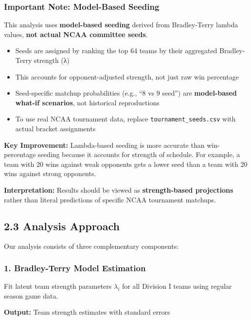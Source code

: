 \documentclass[
]{article}
\providecommand{\tightlist}{%
  \setlength{\itemsep}{0pt}\setlength{\parskip}{0pt}}
\begin{document}
\subsubsection{Important Note: Model-Based
Seeding}\label{important-note-model-based-seeding}

This analysis uses \textbf{model-based seeding} derived from
Bradley-Terry lambda values, \textbf{not actual NCAA committee seeds}.

\begin{itemize}
\tightlist
\item
  Seeds are assigned by ranking the top 64 teams by their aggregated
  Bradley-Terry strength (λ)
\item
  This accounts for opponent-adjusted strength, not just raw win
  percentage
\item
  Seed-specific matchup probabilities (e.g., ``8 vs 9 seed'') are
  \textbf{model-based what-if scenarios}, not historical reproductions
\item
  To use real NCAA tournament data, replace
  \texttt{tournament\_seeds.csv} with actual bracket assignments
\end{itemize}

\textbf{Key Improvement:} Lambda-based seeding is more accurate than
win-percentage seeding because it accounts for strength of schedule. For
example, a team with 20 wins against weak opponents gets a lower seed
than a team with 20 wins against strong opponents.

\textbf{Interpretation:} Results should be viewed as
\textbf{strength-based projections} rather than literal predictions of
specific NCAA tournament matchups.

\subsection{2.3 Analysis Approach}\label{analysis-approach}

Our analysis consists of three complementary components:

\subsubsection{1. Bradley-Terry Model
Estimation}\label{bradley-terry-model-estimation}

Fit latent team strength parameters \(\lambda_i\) for all Division I
teams using regular season game data.

\textbf{Output:} Team strength estimates with standard errors
\end{document}
